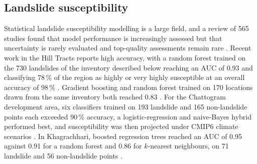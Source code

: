 
\subsection{Landslide susceptibility}

Statistical landslide susceptibility modelling is a large field, and a review of 565 studies found that model performance is increasingly assessed but that uncertainty is rarely evaluated and top-quality assessments remain rare \citep{reichenbach2018}. Recent work in the Hill Tracts reports high accuracy, with a random forest trained on the 730 landslides of the inventory described below reaching an AUC of 0.93 and classifying 78\,\% of the region as highly or very highly susceptible at an overall accuracy of 98\,\% \citep{hossain2025}. Gradient boosting and random forest trained on 170 locations drawn from the same inventory both reached 0.83 \citep{roy2025}. For the Chattogram development area, six classifiers trained on 193 landslide and 165 non-landslide points each exceeded 90\,\% accuracy, a logistic-regression and naive-Bayes hybrid performed best, and susceptibility was then projected under CMIP6 climate scenarios \citep{islama2025}. In Khagrachhari, boosted regression trees reached an AUC of 0.95 against 0.91 for a random forest and 0.86 for $k$-nearest neighbours, on 71 landslide and 56 non-landslide points \citep{hasanm2024}.

